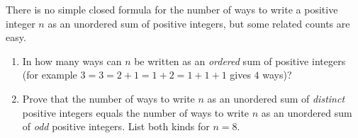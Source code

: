 There is no simple closed formula for the number of ways to write a positive integer $n$ as an unordered sum of positive integers, but some related counts are easy.
\begin{enumerate}
\item[(a)] In how many ways can $n$ be written as an \emph{ordered} sum of positive integers (for example $3=3=2+1=1+2=1+1+1$ gives $4$ ways)?
\item[(b)] Prove that the number of ways to write $n$ as an unordered sum of \emph{distinct} positive integers equals the number of ways to write $n$ as an unordered sum of \emph{odd} positive integers. List both kinds for $n=8$.
\end{enumerate}

